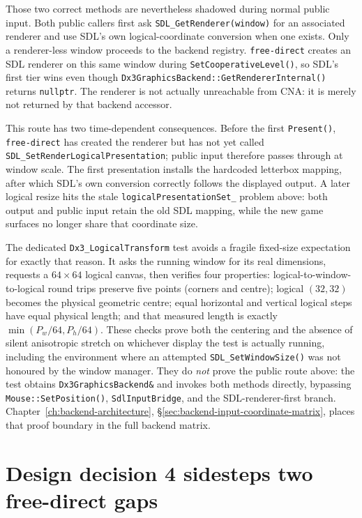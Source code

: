 Those two correct methods are nevertheless shadowed during normal public input. Both public
callers first ask \texttt{SDL\_Get\allowbreak Renderer(window)} for an associated renderer and
use SDL's own logical-coordinate conversion when one exists. Only a renderer-less window
proceeds to the backend registry. \texttt{free-direct} creates an SDL renderer on this same
window during \texttt{SetCooperative\allowbreak Level()}, so SDL's first tier wins even though
\texttt{Dx3Graphics\allowbreak Backend::GetRenderer\allowbreak Internal()} returns
\texttt{nullptr}. The renderer is not actually unreachable from CNA: it is merely not
returned by that backend accessor.

This route has two time-dependent consequences. Before the first \texttt{Present()},
\texttt{free-direct} has created the renderer but has not yet called
\texttt{SDL\_SetRenderLogicalPresentation}; public input therefore passes through at window
scale. The first presentation installs the hardcoded letterbox mapping, after which SDL's own
conversion correctly follows the displayed output. A later logical resize hits the stale
\texttt{logicalPresentationSet\_} problem above: both output and public input retain the old
SDL mapping, while the new game surfaces no longer share that coordinate size.

The dedicated \texttt{Dx3\_LogicalTransform} test avoids a fragile fixed-size expectation for
exactly that reason. It asks the running window for its real dimensions, requests a $64\times64$
logical canvas, then verifies four properties: logical-to-window-to-logical round trips preserve
five points (corners and centre); logical $(32,32)$ becomes the physical geometric centre;
equal horizontal and vertical logical steps have equal physical length; and that measured length
is exactly $\min(P_w/64,P_h/64)$. These checks prove both the centering and the absence of
silent anisotropic stretch on whichever display the test is actually running, including the
environment where an attempted \texttt{SDL\_SetWindowSize()} was not honoured by the window
manager. They do \emph{not} prove the public route above: the test obtains
\texttt{Dx3GraphicsBackend\&} and invokes both methods directly, bypassing
\texttt{Mouse::SetPosition()}, \texttt{SdlInputBridge}, and the SDL-renderer-first branch.
Chapter~\ref{ch:backend-architecture},
\S\ref{sec:backend-input-coordinate-matrix}, places that proof boundary in the full backend
matrix.

\section{Design decision 4 sidesteps two free-direct gaps}

